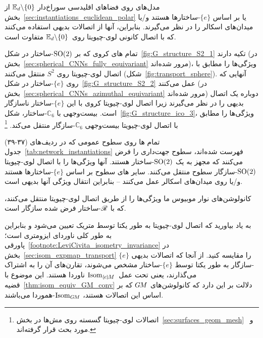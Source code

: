مدل‌های روی فضاهای اقلیدسی سوراخ‌دار $\mathbb{E}_d \backslash \{0\}$ از بخش~\ref{sec:instantiations_euclidean_polar} یا بر اساس $\{e\}$-ساختارها هستند و/یا میدان‌های اسکالر را در نظر می‌گیرند.
بنابراین، آنها از اتصالات بدیهی استفاده می‌کنند که با اتصال کانونی لوی-چیویتا روی~$\mathbb{E}_d \backslash \{0\}$ متفاوت است.

تمام \CNN های کروی که بر $\operatorname{SO}(2)$-ساختار در شکل~\ref{fig:G_structure_S2_1} تکیه دارند (در بخش~\ref{sec:spherical_CNNs_fully_equivariant} مرور شده‌اند)، ویژگی‌ها را مطابق با اتصال لوی-چیویتا روی $S^2$ منتقل می‌کنند (شکل~\ref{fig:transport_sphere}).
آنهایی که روی $\{e\}$-ساختار در شکل~\ref{fig:G_structure_S2_2} عمل می‌کنند (در بخش~\ref{sec:spherical_CNNs_azimuthal_equivariant} مرور شده‌اند) دوباره یک اتصال بدیهی را در نظر می‌گیرند زیرا اتصال لوی-چیویتا کروی با این $\{e\}$-ساختار ناسازگار است.
\CNN بیست‌وجهی با $\mathbb{C}_{6}$-ساختار، شکل~\ref{fig:G_structure_ico_3}، ویژگی‌ها را مطابق با اتصال لوی-چیویتا بیست‌وجهی $\mathbb{C}_{6}$-سازگار منتقل می‌کند.%
\footnote{
	اتصالات لوی-چیویتا گسسته روی مش‌ها در بخش~\ref{sec:surfaces_geom_mesh} و~\cite{craneDiscreteDifferentialGeometry2014,craneTrivialConnectionsDiscrete2010} مورد بحث قرار گرفته‌اند.
}

تمام \CNN ها روی سطوح عمومی که در ردیف‌های (۳۷-۳۹) جدول~\ref{tab:network_instantiations} فهرست شده‌اند،
سطوح جهت‌داری را فرض می‌کنند که مجهز به یک $\operatorname{SO}(2)$-ساختار هستند.
آنها ویژگی‌ها را با اتصال لوی-چیویتا $\operatorname{SO}(2)$-سازگار سطوح منتقل می‌کنند.
سایر \CNN های سطوح بر اساس $\{e\}$-ساختارها هستند و/یا روی میدان‌های اسکالر عمل می‌کنند -- بنابراین انتقال ویژگی آنها بدیهی است.

کانولوشن‌های نوار موبیوس ما ویژگی‌ها را از طریق اتصال لوی-چیویتا منتقل می‌کنند، که با $\mathscr{R}$-ساختار فرض شده سازگار است.

به یاد بیاورید که اتصال لوی-چیویتا به طور یکتا توسط متریک تعیین می‌شود و بنابراین به طور کلی ناوردای ایزومتری است؛ پاورقی~\ref{footnote:LeviCivita_isometry_invariance} در بخش~\ref{sec:isom_expmap_transport} را مقایسه کنید.
از آنجا که اتصالات بدیهی $\{e\}$-سازگار به طور یکتا توسط $\{e\}$-ساختار مشخص می‌شوند، تقارن‌های آن را به اشتراک می‌گذارند، یعنی تحت عمل~$\IsomeM$ ناوردا هستند.
این موضوع با قضیه~\ref{thm:isom_equiv_GM_conv} دلالت بر این دارد که کانولوشن‌های $G\mkern-1.4muM$ که بر اساس این اتصالات هستند، $\operatorname{Isom}_{G\mkern-1.4muM}$-هموردا می‌باشند.

